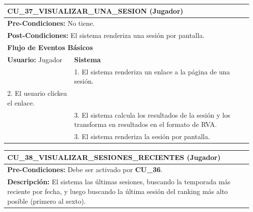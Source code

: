 \begin{center}
  \begin{tabular}{| p{7.5cm} | p{7.5cm} |}
    \hline
    \multicolumn{2}{|p{15cm}|}{\textbf{CU\_37\_VISUALIZAR\_UNA\_SESION} (Jugador)} \\ \hline
    \multicolumn{2}{|p{15cm}|}{\textbf{Pre-Condiciones:} No tiene.} \\ \hline
    \multicolumn{2}{|p{15cm}|}{\textbf{Post-Condiciones:} El sistema renderiza una sesión por pantalla.} \\ \hline
    \multicolumn{2}{|p{7.5cm}|}{\textbf{Flujo de Eventos Básicos}} \\ \hline
    \multicolumn{1}{|p{7.5cm}|}{\textbf{Usuario:} Jugador} & \multicolumn{1}{|p{7.5cm}|}{\textbf{Sistema}} \\ \hline
    
    \multicolumn{1}{|p{7.5cm}|}{} & 
    \multicolumn{1}{|p{7.5cm}|}{1. El sistema renderiza un enlace a la página de una sesión.}\\ \hline
    
    \multicolumn{1}{|p{7.5cm}|}{2. El usuario clickea el enlace.}& 
    \multicolumn{1}{|p{7.5cm}|}{}\\ \hline
    
    \multicolumn{1}{|p{7.5cm}|}{} & 
    \multicolumn{1}{|p{7.5cm}|}{3. El sistema calcula los resultados de la sesión y los transforma en resultados en el formato de RVA.}\\ \hline
    
    \multicolumn{1}{|p{7.5cm}|}{} & 
    \multicolumn{1}{|p{7.5cm}|}{3. El sistema renderiza la sesión por pantalla.}\\ \hline
  \end{tabular}
\end{center}

\begin{center}
  \begin{tabular}{| p{7.5cm} | p{7.5cm} |}
    \hline
    \multicolumn{2}{|p{15cm}|}{\textbf{CU\_38\_VISUALIZAR\_SESIONES\_RECIENTES} (Jugador)} \\ \hline
    \multicolumn{2}{|p{15cm}|}{\textbf{Pre-Condiciones:} Debe ser activado por \textbf{CU\_36}.} \\ \hline
    \multicolumn{2}{|p{15cm}|}{\textbf{Descripción:} El sistema las últimas sesiones, buscando la temporada más reciente por fecha, y luego buscando la última sesión del ranking más alto posible (primero al sexto).} \\
    \hline
  \end{tabular}
\end{center}

